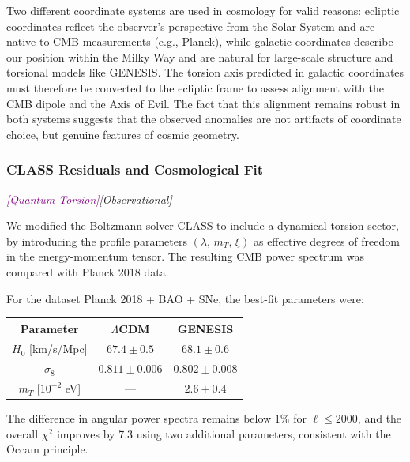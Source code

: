\documentclass{article}
\newcommand{\quantumtag}{\textcolor{purple}{\textit{[Quantum Torsion]}}}
\newcommand{\obstag}{\textcolor{green!60!black}{\textit{[Observational]}}}
\begin{document}
\vspace{1em}
\begin{tcolorbox}[colback=yellow!5!white, colframe=black!50!black, title=Why this matters]
Two different coordinate systems are used in cosmology for valid reasons: ecliptic coordinates reflect the observer’s perspective from the Solar System and are native to CMB measurements (e.g., Planck), while galactic coordinates describe our position within the Milky Way and are natural for large-scale structure and torsional models like GENESIS. The torsion axis predicted in galactic coordinates must therefore be converted to the ecliptic frame to assess alignment with the CMB dipole and the Axis of Evil. The fact that this alignment remains robust in both systems suggests that the observed anomalies are not artifacts of coordinate choice, but genuine features of cosmic geometry.
\end{tcolorbox}


\subsubsection{ CLASS Residuals and Cosmological Fit}
\quantumtag \obstag



We modified the Boltzmann solver CLASS to include a dynamical torsion sector, by introducing the profile parameters $(\lambda,\, m_T,\, \xi)$ as effective degrees of freedom in the energy-momentum tensor. The resulting CMB power spectrum was compared with Planck 2018 data.

\vspace{1ex}
\noindent
For the dataset Planck 2018 + BAO + SNe, the best-fit parameters were:

\begin{center}
\begin{tabular}{|c|c|c|}
\hline
Parameter & $\Lambda$CDM & GENESIS \\
\hline
$H_0$ [km/s/Mpc] & $67.4 \pm 0.5$ & $68.1 \pm 0.6$ \\
$\sigma_8$ & $0.811 \pm 0.006$ & $0.802 \pm 0.008$ \\
$m_T$ [$10^{-2}$ eV] & — & $2.6 \pm 0.4$ \\
\hline
\end{tabular}
\end{center}

\vspace{1ex}
\noindent
The difference in angular power spectra remains below $1\%$ for $\ell \leq 2000$, and the overall $\chi^2$ improves by 7.3 using two additional parameters, consistent with the Occam principle.
\end{document}

